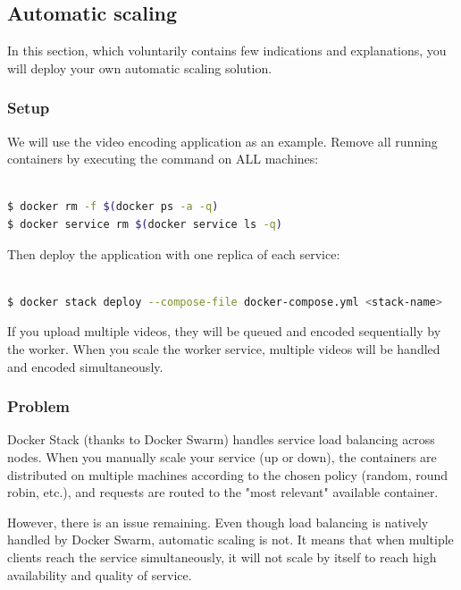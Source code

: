 \documentclass[a4paper,11pt]{exam}
\begin{document}
\clearpage

\subsection{Automatic scaling}

In this section, which voluntarily contains few indications and explanations, you will deploy your own automatic scaling solution.

\subsubsection{Setup}

We will use the video encoding application as an example.
Remove all running containers by executing the command on ALL machines:

\begin{lstlisting}[frame=single,language={sh}]  % Start your code-block

$ docker rm -f $(docker ps -a -q)
$ docker service rm $(docker service ls -q)

\end{lstlisting}

Then deploy the application with one replica of each service:

\begin{lstlisting}[frame=single,language={sh}]  % Start your code-block

$ docker stack deploy --compose-file docker-compose.yml <stack-name>

\end{lstlisting}

If you upload multiple videos, they will be queued and encoded sequentially by the worker.
When you scale the worker service, multiple videos will be handled and encoded simultaneously.

\subsubsection{Problem}

Docker Stack (thanks to Docker Swarm) handles service load balancing across nodes.
When you manually scale your service (up or down), the containers are distributed on multiple machines according to the chosen policy (random, round robin, etc.), and requests are routed to the "most relevant" available container.

However, there is an issue remaining.
Even though load balancing is natively handled by Docker Swarm, automatic scaling is not.
It means that when multiple clients reach the service simultaneously, it will not scale by itself to reach high availability and quality of service.
\end{document}

